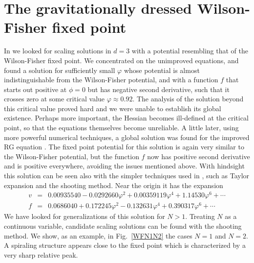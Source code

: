 \documentclass[a4paper,11pt]{revtex4}
\newcommand{\bea}{\begin{eqnarray}}
\newcommand{\eea}{\end{eqnarray}}
\begin{document}
\section{The gravitationally dressed Wilson-Fisher fixed point}


In \cite{pv1} we looked for scaling solutions in $d=3$
with a potential resembling that of the Wilson-Fisher fixed point. 
We concentrated on the unimproved equations,
and found a solution for sufficiently small $\varphi$ 
whose potential is almost indistinguishable from the
Wilson-Fisher potential, and with a function $f$
that starts out positive at $\phi=0$ but has negative
second derivative, such that it crosses zero at
some critical value $\varphi\approx 0.92$.
The analysis of the solution beyond this critical value
proved hard and we were unable to establish its global existence.
Perhaps more important, the Hessian becomes ill-defined at the
critical point, so that the equations themselves become unreliable.
A little later, using more powerful numerical techniques,
a global solution was found for the improved RG equation \cite{bk}.
The fixed point potential for this solution is again
very similar to the Wilson-Fisher potential,
but the function $f$ now has positive second derivative
and is positive everywhere, avoiding the issues mentioned above.
With hindsight this solution can be seen also with the
simpler techniques used in \cite{pv1}, such as
Taylor expansion and the shooting method.
Near the origin it has the expansion
\bea
v&=&0.00935540-0.0292660 \varphi ^2+0.00359119 \varphi ^4+1.14530 \varphi ^6+\cdots
\nonumber \\
f&=&0.0686040+0.172245 \varphi ^2-0.132631 \varphi ^4+0.390317 \varphi ^6+\cdots
\nonumber
\eea
We have looked for generalizations of this solution for $N>1$. 
Treating $N$ as a continuous variable, candidate scaling solutions
can be found with the shooting method.
We show, as an example, in Fig.~\ref{WFN1N2} the cases $N=1$ and $N=2$. 
A spiraling structure appears close to the fixed point which is characterized by a very sharp relative peak. 
\end{document}
